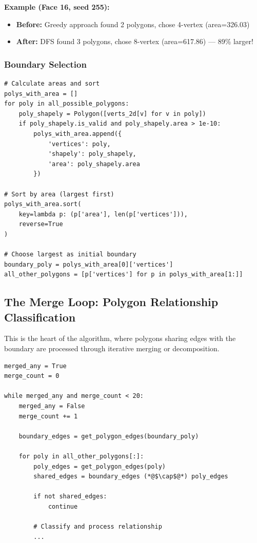 \documentclass[11pt]{article}
\begin{document}
\textbf{Example (Face 16, seed 255):}
\begin{itemize}
    \item \textbf{Before:} Greedy approach found 2 polygons, chose 4-vertex (area=326.03)
    \item \textbf{After:} DFS found 3 polygons, chose 8-vertex (area=617.86) — 89\% larger!
\end{itemize}

\subsubsection{Boundary Selection}

\begin{lstlisting}[caption={Selecting initial boundary candidate},label={lst:boundaryselect}]
# Calculate areas and sort
polys_with_area = []
for poly in all_possible_polygons:
    poly_shapely = Polygon([verts_2d[v] for v in poly])
    if poly_shapely.is_valid and poly_shapely.area > 1e-10:
        polys_with_area.append({
            'vertices': poly,
            'shapely': poly_shapely,
            'area': poly_shapely.area
        })

# Sort by area (largest first)
polys_with_area.sort(
    key=lambda p: (p['area'], len(p['vertices'])),
    reverse=True
)

# Choose largest as initial boundary
boundary_poly = polys_with_area[0]['vertices']
all_other_polygons = [p['vertices'] for p in polys_with_area[1:]]
\end{lstlisting}

\subsection{The Merge Loop: Polygon Relationship Classification}

This is the heart of the algorithm, where polygons sharing edges with the boundary are processed through iterative merging or decomposition.

\begin{lstlisting}[caption={Main merge loop structure},label={lst:mergeloop}]
merged_any = True
merge_count = 0

while merged_any and merge_count < 20:
    merged_any = False
    merge_count += 1
    
    boundary_edges = get_polygon_edges(boundary_poly)
    
    for poly in all_other_polygons[:]:
        poly_edges = get_polygon_edges(poly)
        shared_edges = boundary_edges (*@$\cap$@*) poly_edges
        
        if not shared_edges:
            continue
        
        # Classify and process relationship
        ...
\end{lstlisting}
\end{document}
